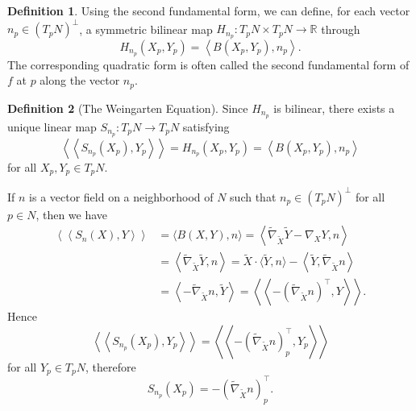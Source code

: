 \documentclass[12pt,a4paper]{book}
\theoremstyle{definition}
\newtheorem{defn}{Definition}[section]
\newtheorem{exam}[defn]{Example}
\begin{document}
\begin{defn}
    Using the second fundamental form, we can define, for each vector $n_p \in\left(T_p N\right)^{\perp}$, a symmetric bilinear map $H_{n_p}: T_p N \times T_p N \rightarrow \mathbb{R}$ through
    $$
        H_{n_p}\left(X_p, Y_p\right)=\left\langle B\left(X_p, Y_p\right), n_p\right\rangle .
    $$
    The corresponding quadratic form is often called the second fundamental form of $f$ at $p$ along the vector $n_p$.
\end{defn}
\begin{defn}[The Weingarten Equation]
    Since $H_{n_p}$ is bilinear, there exists a unique linear map $S_{n_p}: T_p N \rightarrow T_p N$ satisfying
    $$
        \left\langle\left\langle S_{n_p}\left(X_p\right), Y_p\right\rangle\right\rangle=H_{n_p}\left(X_p, Y_p\right)=\left\langle B\left(X_p, Y_p\right), n_p\right\rangle
    $$
    for all $X_p, Y_p \in T_p N$.

    If $n$ is a vector field on a neighborhood of $N$ such that $n_p\in (T_pN)^{\perp}$ for all $p\in N$, then we have
    $$
        \begin{aligned}
            \left\langle\left\langle S_n(X), Y\right\rangle\right\rangle & =\langle B(X, Y), n\rangle=\left\langle\widetilde{\nabla}_{\widetilde{X}} \widetilde{Y}-\nabla_X Y, n\right\rangle                                                                                           \\
                                                                         & =\left\langle\widetilde{\nabla}_{\widetilde{X}} \widetilde{Y}, n\right\rangle=\widetilde{X} \cdot\langle\widetilde{Y}, n\rangle-\left\langle\widetilde{Y}, \widetilde{\nabla}_{\widetilde{X}} n\right\rangle \\
                                                                         & =\left\langle-\widetilde{\nabla}_{\widetilde{X}} n, \widetilde{Y}\right\rangle=\left\langle\left\langle-\left(\widetilde{\nabla}_{\widetilde{X}} n\right)^{\top}, Y\right\rangle\right\rangle .
        \end{aligned}
    $$
    Hence
    $$
        \left\langle\left\langle S_{n_p}\left(X_p\right), Y_p\right\rangle\right\rangle=\left\langle\left\langle-\left(\widetilde{\nabla}_{\widetilde{X}} n\right)_p^{\top}, Y_p\right\rangle\right\rangle
    $$
    for all $Y_p \in T_p N$, therefore
    $$
        S_{n_p}\left(X_p\right)=-\left(\widetilde{\nabla}_{\widetilde{X}} n\right)_p^{\top}.
    $$
\end{defn}
\end{document}
